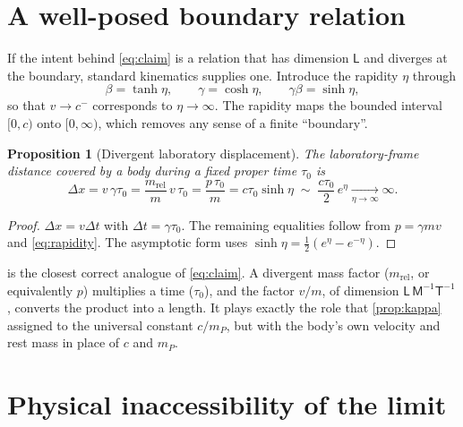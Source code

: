 \documentclass[11pt,a4paper]{article}
\newtheorem{proposition}{Proposition}
\theoremstyle{definition}
\theoremstyle{remark}
\newcommand{\mrel}{m_{\mathrm{rel}}}
\newcommand{\sfM}{\mathsf{M}}
\newcommand{\sfL}{\mathsf{L}}
\newcommand{\sfT}{\mathsf{T}}
\begin{document}
\section{A well-posed boundary relation}\label{sec:wellposed}

If the intent behind \cref{eq:claim} is a relation that has dimension $\sfL$
and diverges at the boundary, standard kinematics supplies one. Introduce the
rapidity $\eta$ through
\begin{equation}
  \beta=\tanh\eta,\qquad \gamma=\cosh\eta,\qquad \gamma\beta=\sinh\eta,
  \label{eq:rapidity}
\end{equation}
so that $v\to c^-$ corresponds to $\eta\to\infty$. The rapidity maps the
bounded interval $[0,c)$ onto $[0,\infty)$, which removes any sense of a
finite ``boundary''.

\begin{proposition}[Divergent laboratory displacement]\label{prop:dx}
The laboratory-frame distance covered by a body during a fixed proper time
$\tau_0$ is
\begin{equation}
  \Delta x=v\,\gamma\tau_0=\frac{\mrel}{m}\,v\,\tau_0
  =\frac{p\,\tau_0}{m}=c\tau_0\sinh\eta
  \;\sim\;\frac{c\tau_0}{2}\,e^{\eta}
  \xrightarrow[\eta\to\infty]{}\infty .
  \label{eq:dx}
\end{equation}
\end{proposition}

\begin{proof}
$\Delta x=v\Delta t$ with $\Delta t=\gamma\tau_0$. The remaining equalities
follow from $p=\gamma mv$ and \cref{eq:rapidity}. The asymptotic form uses
$\sinh\eta=\tfrac12(e^{\eta}-e^{-\eta})$.
\end{proof}

 is the closest correct analogue of \cref{eq:claim}. A divergent
mass factor ($\mrel$, or equivalently $p$) multiplies a time ($\tau_0$), and
the factor $v/m$, of dimension $\sfL\,\sfM^{-1}\sfT^{-1}$, converts the
product into a length. It plays exactly the role that \cref{prop:kappa}
assigned to the universal constant $c/m_P$, but with the body's own velocity
and rest mass in place of $c$ and $m_P$.

\section{Physical inaccessibility of the limit}\label{sec:inaccessible}
\end{document}
